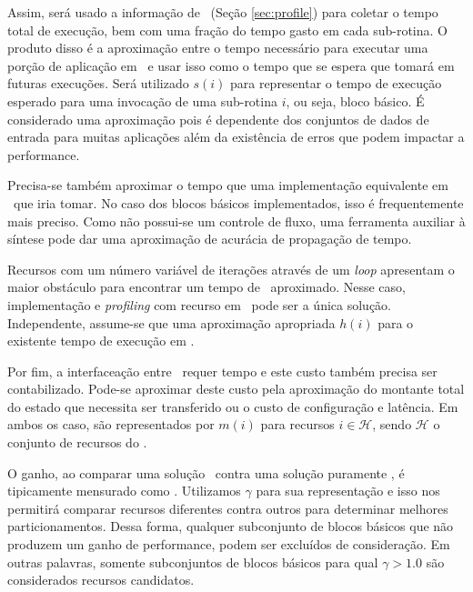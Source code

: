 	Assim, será usado a informação de \profile\ (Seção \ref{sec:profile}) para coletar o tempo total de execução, bem com uma fração do tempo gasto em cada sub-rotina.
    O produto disso é a aproximação entre o tempo necessário para executar uma porção de aplicação em \software\ e usar isso como o tempo que se espera que tomará em futuras execuções. 
    Será utilizado $ s(i) $ para representar o tempo de execução esperado para uma invocação de uma sub-rotina $ i $, ou seja, bloco básico. 
    É considerado uma aproximação pois é dependente dos conjuntos de dados de entrada para muitas aplicações além da existência de erros que podem impactar a performance.

	Precisa-se também aproximar o tempo que uma implementação equivalente em \hardware\ que iria tomar. 
    No caso dos blocos básicos implementados, isso é frequentemente mais preciso. 
    Como não possui-se um controle de fluxo, uma ferramenta auxiliar à síntese pode dar uma aproximação de acurácia de propagação de tempo.

    Recursos com um número variável de iterações através de um \textit{loop} apresentam o maior obstáculo para encontrar um tempo de \hardware\ aproximado. 
    Nesse caso, implementação e \textit{profiling} com recurso em \hardware\ pode ser a única solução. 
    Independente, assume-se que uma aproximação apropriada $ h(i) $ para o existente tempo de execução em \hardware.

	Por fim, a interfaceação entre \hs\ requer tempo e este custo também precisa ser contabilizado. Pode-se aproximar deste custo pela aproximação do montante total do estado que necessita ser transferido ou o custo de configuração e latência. Em ambos os caso, são representados por $ m(i) $ para recursos $ i \in \mathcal{H} $, sendo $\mathcal{H}$ o conjunto de recursos do \hardware.

    O ganho, ao comparar uma solução \hs\ contra uma solução puramente \software, é tipicamente mensurado como \speedup. Utilizamos $ \gamma $ para sua representação e isso nos permitirá comparar recursos diferentes contra outros para determinar melhores particionamentos.
    Dessa forma, qualquer subconjunto de blocos básicos que não produzem um ganho de performance, podem ser excluídos de consideração. Em outras palavras, somente subconjuntos de blocos básicos para qual $ \gamma > 1.0 $ são considerados recursos candidatos.

